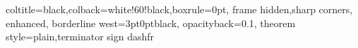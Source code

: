 %
{coltitle=black,colback=white!60!black,boxrule=0pt,
frame hidden,sharp corners, enhanced,
borderline west={3pt}{0pt}{black},
opacityback=0.1,
theorem style=plain,terminator sign dash}{fr}

\newcommand{\N}{\mathbb{N}}
\newcommand{\Z}{\mathbb{Z}}
\newcommand{\Q}{\mathbb{Q}}
\newcommand{\R}{\mathbb{R}}
\newcommand{\C}{\mathbb{C}}

\newcommand{\mangle}[1]{\measuredangle #1}
\newcommand{\sangle}[1]{\sphericalangle #1}

\renewcommand{\and}{\; \wedge \;}
\renewcommand{\or}{\; \vee \;}
